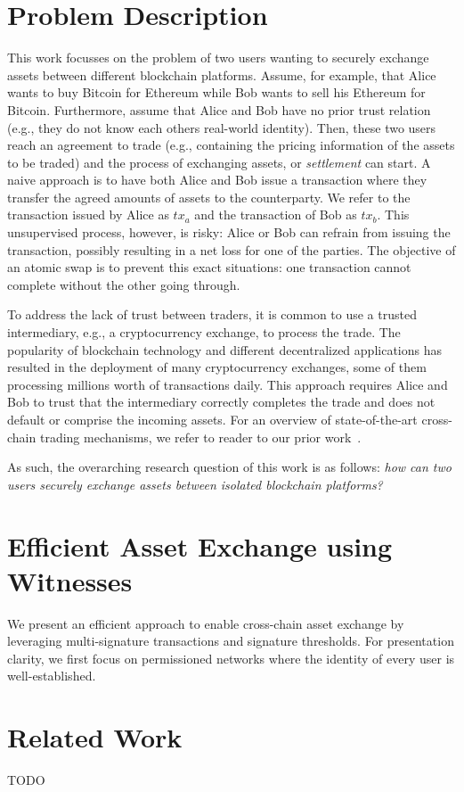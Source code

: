 \documentclass{article}
\begin{document}
\section{Problem Description}
This work focusses on the problem of two users wanting to securely exchange assets between different blockchain platforms.
Assume, for example, that Alice wants to buy Bitcoin for Ethereum while Bob wants to sell his Ethereum for Bitcoin.
Furthermore, assume that Alice and Bob have no prior trust relation (e.g., they do not know each others real-world identity).
Then, these two users reach an agreement to trade (e.g., containing the pricing information of the assets to be traded) and the process of exchanging assets, or \emph{settlement} can start.
A naive approach is to have both Alice and Bob issue a transaction where they transfer the agreed amounts of assets to the counterparty.
We refer to the transaction issued by Alice as $ tx_a $ and the transaction of Bob as $ tx_b $.
This unsupervised process, however, is risky: Alice or Bob can refrain from issuing the transaction, possibly resulting in a net loss for one of the parties.
The objective of an atomic swap is to prevent this exact situations: one transaction cannot complete without the other going through.

To address the lack of trust between traders, it is common to use a trusted intermediary, e.g., a cryptocurrency exchange, to process the trade.
The popularity of blockchain technology and different decentralized applications has resulted in the deployment of many cryptocurrency exchanges, some of them processing millions worth of transactions daily.
This approach requires Alice and Bob to trust that the intermediary correctly completes the trade and does not default or comprise the incoming assets.
For an overview of state-of-the-art cross-chain trading mechanisms, we refer to reader to our prior work~\cite{de2021xchange}.

As such, the overarching research question of this work is as follows: \emph{how can two users securely exchange assets between isolated blockchain platforms?}

\section{Efficient Asset Exchange using Witnesses}
We present an efficient approach to enable cross-chain asset exchange by leveraging multi-signature transactions and signature thresholds.
For presentation clarity, we first focus on permissioned networks where the identity of every user is well-established.

\section{Related Work}
TODO



\end{document}

